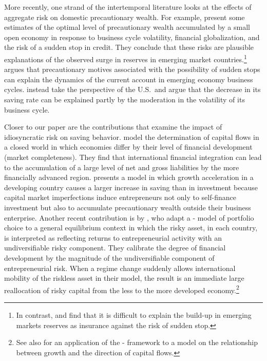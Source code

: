 \documentclass[titlepage]{\econtex}\newcommand{\texname}{cjSOE}
\begin{document}
More recently, one strand of the intertemporal literature looks at the
effects of aggregate risk on domestic precautionary wealth. For
example, \cite{dmtMercant} present some estimates of the optimal level
of precautionary wealth accumulated by a small open economy in
response to business cycle volatility, financial globalization, and
the risk of a sudden stop in credit. They conclude that these risks
are plausible explanations of the observed surge in reserves in
emerging market countries.\footnote{In contrast,
  \cite{JeanneBrookings} and \cite{JRreserves} find that it is
  difficult to explain the build-up in emerging markets reserves as
  insurance against the risk of sudden stop.}  \cite{arbatliThesis}
argues that precautionary motives associated with the possibility of
sudden stops can explain the dynamics of the current account in
emerging economy business cycles.  \cite{fogliPerriMod} instead take
the perspective of the U.S.\ and argue that the decrease in its saving
rate can be explained partly by the moderation in the volatility of
its business cycle.

Closer to our paper are the contributions that examine the impact of
idiosyncratic risk on saving behavior. \cite{mqrImbal} model the
determination of capital flows in a closed world in which economies
differ by their level of financial development (market
completeness). They find that international financial integration can
lead to the accumulation of a large level of net and gross liabilities
by the more financially advanced region. \cite{sandri:growthcapflows}
presents a model in which growth acceleration in a developing country
causes a larger increase in saving than in investment because capital
market imperfections induce entrepreneurs not only to self-finance
investment but also to accumulate precautionary wealth outside their
business enterprise.
Another recent contribution is by \cite{paEntrep}, who adapt a
\cite{merton:restat}-\cite{samuelson:portfolio} model of portfolio
choice to a general equilibrium context in which the risky asset, in
each country, is interpreted as reflecting returns to entrepreneurial activity with an
undiversifiable risky component.  They calibrate the degree of
financial development by the magnitude of the undiversifiable
component of entrepreneurial risk.
When a regime change suddenly allows international mobility of the
riskless asset in their model, the result is an immediate large reallocation of risky
capital from the less to the more developed economy.\footnote{See also \cite{Benhima2013} for an application of the \cite{merton:restat}-\cite{samuelson:portfolio} framework to a model on the relationship between growth and the direction of capital flows.}
\end{document}
